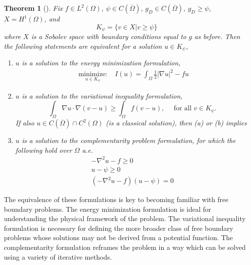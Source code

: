 \documentclass[]{interact}
\theoremstyle{plain}%
\newtheorem{theorem}{Theorem}[section]
\theoremstyle{definition}
\theoremstyle{remark}
\newcommand{\abs}[1]{\left| #1 \right|}
\begin{document}
\begin{theorem}[\cite{KinderlehrerStampacchia1980}] Fix $f \in L^2(\Omega)$, $\psi \in C(\overline{\Omega})$, $g_D \in C(\overline{\Omega})$, $g_D \geq \psi$, $X = H^1(\Omega)$, and
  \begin{equation}
    K_\psi = \{v \in X| v \geq \psi\}
  \end{equation}
   where $X$ is a Sobolev space with boundary conditions equal to $g$ as before. Then the following statements are equivalent for a solution $u \in K_\psi$, 
  \begin{enumerate}
    \item[(a)] $u$ is a solution to the energy minimization formulation, 
\begin{align}
    \underset{u \in K_\psi}{\text{ minimize: }}  &I(u) = \int_\Omega \frac{1}{2} \abs{\nabla u}^2 - fu 
  \end{align}
    \item[(b)] $u$ is a solution to the variational inequality formulation,
      \begin{equation}
    \int_\Omega \nabla u \cdot \nabla(v - u) \geq \int_\Omega f(v - u), \quad \text{ for all } v \in K_\psi.
  \end{equation} 
If also $u \in C(\overline{\Omega}) \cap C^2(\Omega)$ (is a classical solution), then (a) or (b) implies
    \item[(c)] $u$ is a solution to the complementarity problem formulation, for which the following hold over $\Omega$ a.e.
    \begin{subequations}
      \label{ncp}
      \begin{align}
        -\nabla^2 u - f \geq 0\label{ncp:1}\\
        u - \psi \geq 0\label{ncp:2}\\
        (-\nabla^2u - f)(u - \psi) = 0\label{ncp:3}
      \end{align}
    \end{subequations}
  \end{enumerate}
\end{theorem}

The equivalence of these formulations is key to becoming familiar with free boundary problems. The energy minimization formulation is ideal for understanding the physical framework of the problem. The variational inequality formulation is necessary for defining the more broader class of free boundary problems whose solutions may not be derived from a potential function. The complementarity formulation reframes the problem in a way which can be solved using a variety of iterative methods.
\end{document}
